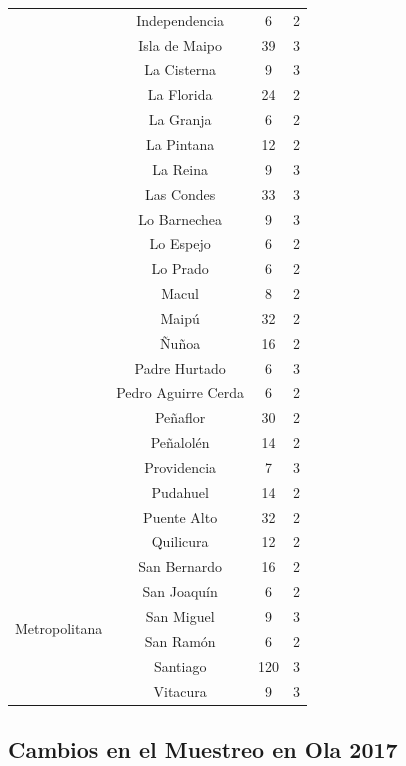 \documentclass[12pt]{report}
\begin{document}
\begin{center}
\begin{longtable}{cccc}
		&Independencia       &  6 & 2     \\
		&Isla de Maipo       &  39 & 3     \\
		&La Cisterna         &  9 & 3     \\
		&La Florida          &  24 & 2     \\
		&La Granja           &  6 & 2     \\
		&La Pintana          &  12 &2     \\
		&La Reina            &  9 & 3     \\
		&Las Condes          &  33 & 3     \\
		&Lo Barnechea        &  9 & 3     \\
		&Lo Espejo           &  6 & 2     \\
		&Lo Prado            &  6 & 2     \\
		&Macul               &  8 & 2     \\
		&Maipú   			 &  32 & 2     \\
		&Ñuñoa   			 &  16 & 2     \\
		&Padre Hurtado    	 &  6 & 3     \\
		&Pedro Aguirre Cerda &  6 & 2     \\
		&Peñaflor   		 &  30 & 2     \\
		&Peñalolén  		 &  14 & 2     \\
		&Providencia  		 &  7 & 3     \\
		&Pudahuel    		 &  14 & 2     \\
		&Puente Alto    	 &  32 & 2     \\
		&Quilicura 			 &  12 & 2     \\
		
		\multirow{6}{*}{Metropolitana}&San Bernardo    	 &  16 & 2     \\
		&San Joaquín    	 &  6 & 2     \\
		&San Miguel          &  9 & 3     \\
		&San Ramón    		 &  6 & 2     \\
		&Santiago            &  120 & 3     \\
		&Vitacura            &  9 & 3     \\
		\bottomrule
		
	\end{longtable}
\end{center}

\subsection*{Cambios en el Muestreo en Ola 2017}
\end{document}
